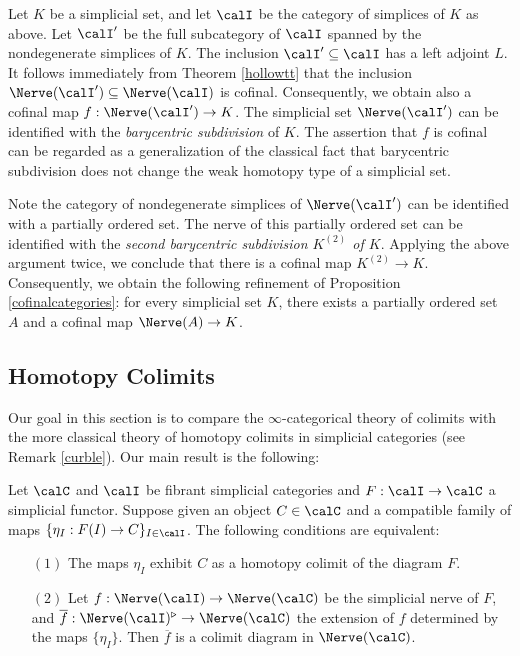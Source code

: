 \begin{variant}\label{baryvar}
Let $K$ be a simplicial set, and let $\calI$ be the category of simplices of $K$ as above.
Let $\calI'$ be the full subcategory of $\calI$ spanned by the nondegenerate simplices of $K$. 
The inclusion $\calI' \subseteq \calI$ has a left adjoint $L$. It follows immediately from Theorem \ref{hollowtt} that the inclusion $\Nerve(\calI') \subseteq \Nerve(\calI)$ is cofinal. Consequently,
we obtain also a cofinal map $f: \Nerve(\calI') \rightarrow K$. The simplicial set
$\Nerve(\calI')$ can be identified with the {\it barycentric subdivision} of $K$. The assertion that $f$ is cofinal can be regarded as a generalization of the classical fact that barycentric subdivision does not change the weak homotopy type of a simplicial set. 

Note the category of nondegenerate simplices of $\Nerve(\calI')$ can be identified with a partially ordered set. The nerve of this partially ordered set can be identified with the {\it second barycentric subdivision $K^{(2)}$ of $K$}. Applying the above argument twice, we conclude that
there is a cofinal map $K^{(2)} \rightarrow K$. Consequently, we obtain the following refinement of 
Proposition \ref{cofinalcategories}: for every simplicial set $K$, there exists a partially ordered set $A$ and a cofinal map $\Nerve(A) \rightarrow K$.
\end{variant}

\subsection{Homotopy Colimits}\label{quasilimit4}

Our goal in this section is to compare the $\infty$-categorical theory of colimits with
the more classical theory of homotopy colimits in simplicial categories (see
Remark \ref{curble}). Our main result is the following:

\begin{theorem}\label{colimcomparee}
Let $\calC$ and $\calI$ be fibrant simplicial categories and
$F: \calI \rightarrow \calC$ a simplicial functor. Suppose given an object $C \in \calC$ and a compatible
family of maps $\{ \eta_{I}: F(I) \rightarrow C \}_{I \in \calI}$. The following conditions are
equivalent:
\begin{itemize}
\item[$(1)$] The maps $\eta_I$ exhibit $C$ as a homotopy colimit of the diagram $F$.
\item[$(2)$] Let $f: \Nerve(\calI) \rightarrow \Nerve(\calC)$ be the simplicial nerve of $F$,
and $\overline{f}: \Nerve(\calI)^{\triangleright} \rightarrow \Nerve(\calC)$ the
extension of $f$ determined by the maps $\{ \eta_I \}$. Then
$\overline{f}$ is a colimit diagram in $\Nerve(\calC)$.
\end{itemize}
\end{theorem}

